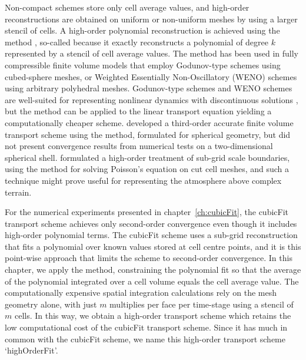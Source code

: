 Non-compact schemes store only cell average values, and high-order reconstructions are obtained on uniform or non-uniform meshes by using a larger stencil of cells.
A high-order polynomial reconstruction is achieved using the \kexact{} method \citep{barth1995}, so-called because it exactly reconstructs a polynomial of degree $k$ represented by a stencil of cell average values.
The \kexact{} method has been used in fully compressible finite volume models that employ Godunov-type schemes \citep{ullrich-jablonowski2012} using cubed-sphere meshes, or Weighted Essentially Non-Oscillatory (WENO) schemes \citep{tsoutsanis-drikakis2016} using arbitrary polyhedral meshes.
Godunov-type schemes and WENO schemes are well-suited for representing nonlinear dynamics with discontinuous solutions \citep{leveque2002}, but the \kexact{} method can be applied to the linear transport equation yielding a computationally cheaper scheme.
\citet{sjoegreen2012} developed a third-order accurate finite volume transport scheme using the \kexact{} method, formulated for spherical geometry, but did not present convergence results from numerical tests on a two-dimensional spherical shell.
\citet{devendran2017} formulated a high-order treatment of sub-grid scale boundaries, using the \kexact{} method for solving Poisson's equation on cut cell meshes, and such a technique might prove useful for representing the atmosphere above complex terrain.

For the numerical experiments presented in chapter~\ref{ch:cubicFit}, the cubicFit transport scheme achieves only second-order convergence even though it includes high-order polynomial terms.
The cubicFit scheme uses a sub-grid reconstruction that fits a polynomial over known values stored at cell centre points, and it is this point-wise approach that limits the scheme to second-order convergence.
In this chapter, we apply the \kexact{} method, constraining the polynomial fit so that the average of the polynomial integrated over a cell volume equals the cell average value.
The computationally expensive spatial integration calculations rely on the mesh geometry alone, with just $m$ multiplies per face per time-stage using a stencil of $m$ cells.
In this way, we obtain a high-order transport scheme which retains the low computational cost of the cubicFit transport scheme.
Since it has much in common with the cubicFit scheme, we name this high-order transport scheme `highOrderFit'.

